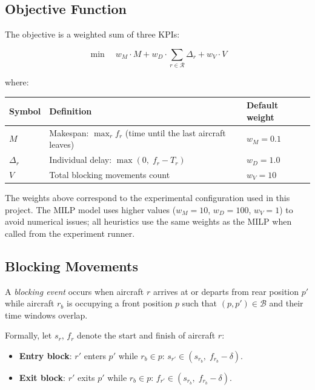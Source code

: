 \subsection{Objective Function}

The objective is a weighted sum of three KPIs:

\begin{equation}
    \min \quad
    w_M \cdot M
    + w_D \cdot \sum_{r \in \mathcal{R}} \Delta_r
    + w_V \cdot V
    \label{eq:objective}
\end{equation}

\noindent where:

\begin{center}
\begin{tabular}{lll}
\toprule
Symbol & Definition & Default weight \\
\midrule
$M$ & Makespan: $\max_{r} f_r$ (time until the last aircraft leaves) & $w_M = 0.1$ \\
$\Delta_r$ & Individual delay: $\max(0,\; f_r - T_r)$ & $w_D = 1.0$ \\
$V$ & Total blocking movements count & $w_V = 10$ \\
\bottomrule
\end{tabular}
\end{center}

The weights above correspond to the experimental configuration used in this
project.  The MILP model uses higher values ($w_M=10$, $w_D=100$, $w_V=1$)
to avoid numerical issues; all heuristics use the same weights as the MILP when
called from the experiment runner.

\subsection{Blocking Movements}

A \emph{blocking event} occurs when aircraft $r$ arrives at or departs from
rear position $p'$ while aircraft $r_b$ is occupying a front position $p$ such
that $(p,p') \in \mathcal{B}$ and their time windows overlap.

Formally, let $s_r$, $f_r$ denote the start and finish of aircraft $r$:

\begin{itemize}[noitemsep]
    \item \textbf{Entry block}: $r'$ enters $p'$ while $r_b \in p$:
          $s_{r'} \in (s_{r_b},\; f_{r_b} - \delta)$.
    \item \textbf{Exit block}: $r'$ exits $p'$ while $r_b \in p$:
          $f_{r'} \in (s_{r_b},\; f_{r_b} - \delta)$.
\end{itemize}

